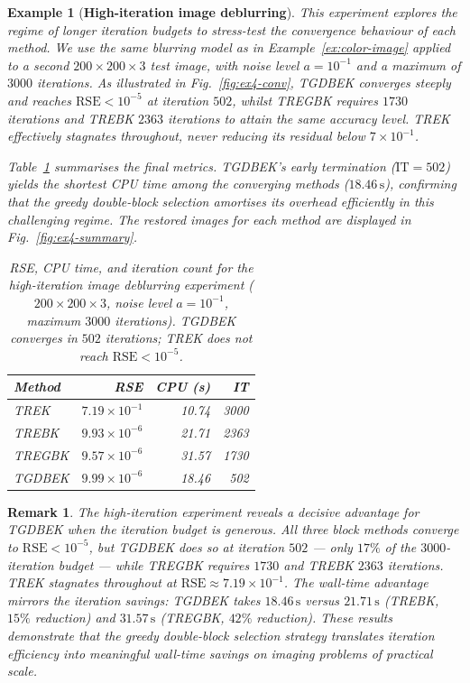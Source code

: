 \documentclass[11pt]{article}
\newtheorem{example}[theorem]{Example}
\newtheorem{remark}[theorem]{Remark}
\begin{document}
\begin{example}[\textbf{High-iteration image deblurring}] \label{ex:gray-image}
This experiment explores the regime of longer iteration budgets to stress-test the convergence behaviour of each method. We use the same blurring model as in Example~\ref{ex:color-image} applied to a second $200\times200\times3$ test image, with noise level $a = 10^{-1}$ and a maximum of $3000$ iterations. As illustrated in Fig.~\ref{fig:ex4-conv}, TGDBEK converges steeply and reaches $\mathrm{RSE} < 10^{-5}$ at iteration $502$, whilst TREGBK requires $1730$ iterations and TREBK $2363$ iterations to attain the same accuracy level. TREK effectively stagnates throughout, never reducing its residual below $7\times 10^{-1}$.

Table~\ref{tab:ex4} summarises the final metrics. TGDBEK's early termination ($\mathrm{IT}=502$) yields the shortest CPU time among the converging methods ($18.46\,\mathrm{s}$), confirming that the greedy double-block selection amortises its overhead efficiently in this challenging regime. The restored images for each method are displayed in Fig.~\ref{fig:ex4-summary}.
\begin{table}[ht]
\centering
\begin{tabular}{lrrr}
\toprule
Method & RSE & CPU (s) & IT \\
\midrule
TREK   & $7.19\times10^{-1}$ & 10.74 & 3000 \\
TREBK  & $9.93\times10^{-6}$ & 21.71 & 2363 \\
TREGBK & $9.57\times10^{-6}$ & 31.57 & 1730 \\
TGDBEK & $9.99\times10^{-6}$ & 18.46 &  502 \\
\bottomrule
\end{tabular}
\caption{RSE, CPU time, and iteration count for the high-iteration image deblurring experiment ($200\times200\times3$, noise level $a=10^{-1}$, maximum $3000$ iterations). TGDBEK converges in $502$ iterations; TREK does not reach $\mathrm{RSE}<10^{-5}$.}
\label{tab:ex4}
\end{table}
\end{example}

\begin{remark}
The high-iteration experiment reveals a decisive advantage for TGDBEK when the iteration budget is generous. All three block methods converge to $\mathrm{RSE}<10^{-5}$, but TGDBEK does so at iteration $502$ — only $17\%$ of the $3000$-iteration budget — while TREGBK requires $1730$ and TREBK $2363$ iterations. TREK stagnates throughout at $\mathrm{RSE}\approx7.19\times10^{-1}$. The wall-time advantage mirrors the iteration savings: TGDBEK takes $18.46\,\mathrm{s}$ versus $21.71\,\mathrm{s}$ (TREBK, $15\%$ reduction) and $31.57\,\mathrm{s}$ (TREGBK, $42\%$ reduction). These results demonstrate that the greedy double-block selection strategy translates iteration efficiency into meaningful wall-time savings on imaging problems of practical scale.
\end{remark}
\end{document}
